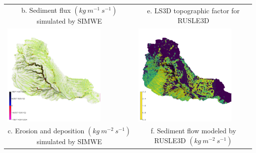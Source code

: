 \documentclass{standalone}
\begin{document}
\begin{tabular}{m{} m{}}
\multicolumn{1}{c}{b. Sediment flux $(kg~m^{-1}~s^{-1})$ simulated by SIMWE}&
\multicolumn{1}{c}{e. LS3D topographic factor for RUSLE3D}\\
\includegraphics[height=50mm,center]{../../images/sample_data/erosion_deposition_2016.png}&
\includegraphics[height=50mm,center]{../../images/sample_data/sediment_flow_2016.png}\\
\multicolumn{1}{c}{c. Erosion and deposition $(kg~m^{-2}~s^{-1})$ simulated by SIMWE}&
\multicolumn{1}{c}{f. Sediment flow modeled by RUSLE3D $(kg ~ m^{-2} ~ s^{-1})$}\\
%
\end{tabular}
\end{document}
